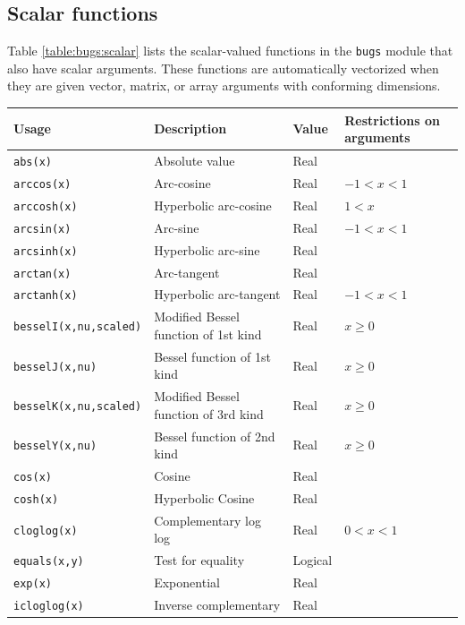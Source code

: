 \documentclass[11pt, a4paper, titlepage]{report}
\begin{document}
\subsection{Scalar functions}

Table \ref{table:bugs:scalar} lists the scalar-valued functions in the
\texttt{bugs} module that also have scalar arguments.  These functions
are automatically vectorized when they are given vector, matrix, or
array arguments with conforming dimensions.


\begin{table}[p]
\begin{center}
\begin{tabular}{llll}
\hline
Usage  & Description & Value & Restrictions on arguments \\ 
\hline
\verb+abs(x)+       & Absolute value        & Real & \\
\verb+arccos(x)+    & Arc-cosine            & Real & $-1 < x < 1$\\
\verb+arccosh(x)+   & Hyperbolic arc-cosine & Real & $1 < x$ \\
\verb+arcsin(x)+    & Arc-sine              & Real & $-1 < x < 1$\\
\verb+arcsinh(x)+   & Hyperbolic arc-sine   & Real &\\
\verb+arctan(x)+    & Arc-tangent           & Real &\\
\verb+arctanh(x)+   & Hyperbolic arc-tangent & Real & $-1 < x < 1$\\
\verb+besselI(x,nu,scaled)+ &Modified Bessel function of 1st kind & Real & $x \geq 0$ \\
\verb+besselJ(x,nu)+ &Bessel function of 1st kind & Real & $x \geq 0$ \\
\verb+besselK(x,nu,scaled)+ &Modified Bessel function of 3rd kind & Real & $x \geq 0$ \\
\verb+besselY(x,nu)+ &Bessel function of 2nd kind & Real & $x \geq 0$ \\
\verb+cos(x)+       & Cosine              & Real & \\
\verb+cosh(x)+      & Hyperbolic Cosine   & Real & \\
\verb+cloglog(x)+    & Complementary log log & Real & $0 < x < 1$ \\
\verb+equals(x,y)+   & Test for equality   & Logical & \\
\verb+exp(x)+       & Exponential         & Real & \\
\verb+icloglog(x)+  & Inverse complementary & Real & \\

\end{tabular}
\end{center}
\end{table}
\end{document}
